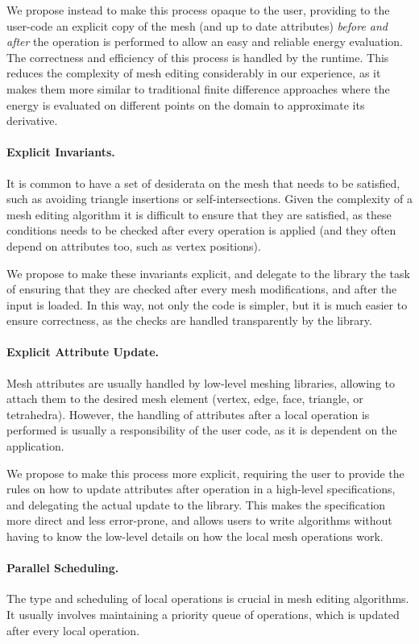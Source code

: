 We propose instead to make this process {opaque} to the user, providing to the user-code an explicit copy of the  mesh (and up to date attributes) \emph{before and after} the operation is performed to allow an easy and reliable energy evaluation. The correctness and efficiency of this process is handled by the runtime. This reduces the complexity of mesh editing considerably in our experience, as it makes them more similar to traditional finite difference approaches where the energy is evaluated on different points on the domain to approximate its derivative.

\paragraph{Explicit Invariants.}
It is common to have a set of desiderata on the mesh that needs to be satisfied, such as avoiding triangle insertions or self-intersections. Given the complexity of a mesh editing algorithm it is difficult to ensure that they are satisfied, as these conditions needs to be checked after every operation is applied (and they often depend on attributes too, such as vertex positions).

We propose to make these invariants explicit, and delegate to the library the task of ensuring that they are checked after every mesh modifications, and after the input is loaded. In this way, not only the code is simpler, but it is much easier to ensure correctness, as the checks are handled transparently by the library.

\paragraph{Explicit Attribute Update.}
Mesh attributes are usually handled by low-level meshing libraries, allowing to attach them to the desired mesh element (vertex, edge, face, triangle, or tetrahedra). However, the handling of attributes after a local operation is performed is usually a responsibility of the user code, as it is dependent on the application. 

We propose to make this process more explicit, requiring the user to provide the rules on how to update attributes after operation in a high-level specifications, and delegating the actual update to the library. This makes the specification more direct and less error-prone, and allows users to write algorithms without having to know the low-level details on how the local mesh operations work.

\paragraph{Parallel Scheduling.}
The type and scheduling of local operations is crucial in mesh editing algorithms. It usually involves maintaining a priority queue of operations, which is updated after every local operation.


